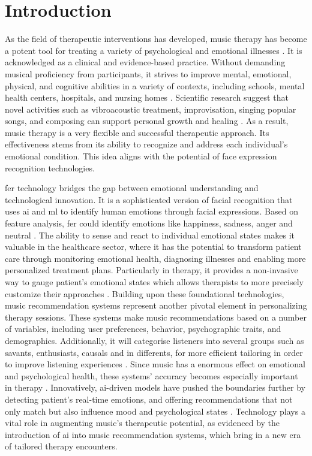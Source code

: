 \section{Introduction}
As the field of therapeutic interventions has developed, music therapy has become a potent tool for treating a variety of psychological and emotional illnesses \citep{americanmusictherapyassociation_2005_what}.
It is acknowledged as a clinical and evidence-based practice. Without demanding musical proficiency from participants, it strives to improve mental, emotional, physical, and cognitive abilities in a variety of contexts, including schools, mental health centers, hospitals, and nursing homes \citep{clevelandclinic_2020_music}.
Scientific research suggest that novel activities such as vibroacoustic treatment, improvisation, singing popular songs, and composing can support personal growth and healing \citep{craig_2019_what}.
As a result, music therapy is a very flexible and successful therapeutic approach. 
Its effectiveness stems from its ability to recognize and address each individual's emotional condition. 
This idea aligns with the potential of face expression recognition technologies.

\gls{fer} technology bridges the gap between emotional understanding and technological innovation.
It is a sophisticated version of facial recognition that uses \gls{ai} and \gls{ml} to identify human emotions through facial expressions.
Based on feature analysis, \gls{fer} could identify emotions like happiness, sadness, anger and neutral \citep{huang_2023_a}.
The ability to sense and react to individual emotional states makes it valuable in the healthcare sector, where it has the potential to transform patient care through monitoring emotional health, diagnosing illnesses and enabling more personalized treatment plans.
Particularly in therapy, it provides a non-invasive way to gauge patient's emotional states which allows therapists to more precisely customize their approaches \citep{zharovskikh_2020_how}.
\newpage
\indent Building upon these foundational technologies, music recommendation systems represent another pivotal element in personalizing therapy sessions. 
These systems make music recommendations based on a number of variables, including user preferences, behavior, psychographic traits, and demographics. 
Additionally, it will categorise listeners into several groups such as savants, enthusiasts, causals and in differents, for more efficient tailoring in order to improve listening experiences \citep{song_2012_a}.
Since music has a enormous effect on emotional and psychological health, these systems' accuracy becomes especially important in therapy \citep{schedl_2021_music}.
Innovatively, \gls{ai}-driven models have pushed the boundaries further by detecting patient's real-time emotions, and offering recommendations that not only match but also influence mood and psychological states \citep{babu2023emotionaware}.
Technology plays a vital role in augmenting music's therapeutic potential, as evidenced by the introduction of \gls{ai} into music recommendation systems, which bring in a new era of tailored therapy encounters.

